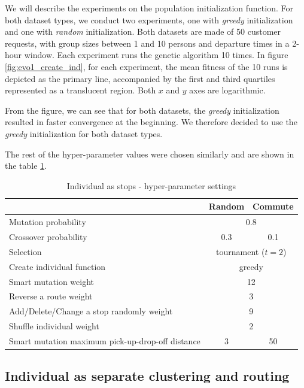 \label{experiment_graph_description}
We will describe the experiments on the population initialization function. For both dataset types, we conduct two experiments, one with \textit{greedy} initialization and one with \textit{random} initialization. Both datasets are made of 50 customer requests, with group sizes between 1 and 10 persons and departure times in a 2-hour window. Each experiment runs the genetic algorithm 10 times. In figure \ref{fig:evo1_create_ind}, for each experiment, the mean fitness of the 10 runs is depicted as the primary line, accompanied by the first and third quartiles represented as a translucent region. Both $x$ and $y$ axes are logarithmic.

From the figure, we can see that for both datasets, the \textit{greedy} initialization resulted in faster convergence at the beginning. We therefore decided to use the \textit{greedy} initialization for both dataset types.

The rest of the hyper-parameter values were chosen similarly and are shown in the table \ref{tab:evo_stops_hyperparams}.

\begin{table}[h]
    \centering
    \begin{tabular}{lcc}
         & Random & Commute \\
        \hline
        Mutation probability & \multicolumn{2}{c}{0.8} \\
        Crossover probability & 0.3 & 0.1 \\
        Selection & \multicolumn{2}{c}{tournament ($t=2$)} \\
        Create individual function & \multicolumn{2}{c}{greedy} \\
        Smart mutation weight & \multicolumn{2}{c}{12} \\
        Reverse a route weight & \multicolumn{2}{c}{3} \\
        Add/Delete/Change a stop randomly weight & \multicolumn{2}{c}{9} \\
        Shuffle individual weight & \multicolumn{2}{c}{2} \\
        Smart mutation maximum pick-up-drop-off distance & 3 & 50 \\
    \end{tabular}
    \caption{Individual as stops - hyper-parameter settings}
    \label{tab:evo_stops_hyperparams}
\end{table}

\subsection{Individual as separate clustering and routing}

